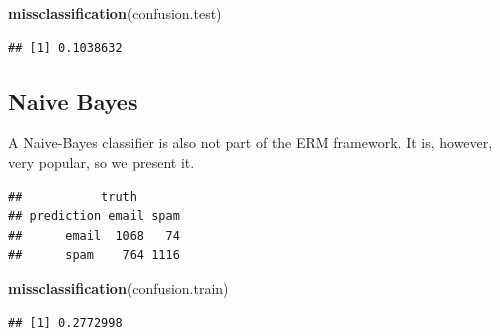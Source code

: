 \documentclass[]{book}
\newenvironment{Shaded}{\begin{snugshade}}{\end{snugshade}}
\newcommand{\KeywordTok}[1]{\textcolor[rgb]{0.13,0.29,0.53}{\textbf{{#1}}}}
\newcommand{\DataTypeTok}[1]{\textcolor[rgb]{0.13,0.29,0.53}{{#1}}}
\newcommand{\FloatTok}[1]{\textcolor[rgb]{0.00,0.00,0.81}{{#1}}}
\newcommand{\StringTok}[1]{\textcolor[rgb]{0.31,0.60,0.02}{{#1}}}
\newcommand{\CommentTok}[1]{\textcolor[rgb]{0.56,0.35,0.01}{\textit{{#1}}}}
\newcommand{\NormalTok}[1]{{#1}}
\theoremstyle{definition}
\theoremstyle{definition}
\theoremstyle{remark}
\begin{document}
\begin{Shaded}
\begin{Highlighting}[]
\KeywordTok{missclassification}\NormalTok{(confusion.test)}
\end{Highlighting}
\end{Shaded}

\begin{verbatim}
## [1] 0.1038632
\end{verbatim}

\subsection{Naive Bayes}\label{naive-bayes}

A Naive-Bayes classifier is also not part of the ERM framework. It is,
however, very popular, so we present it.

\begin{Shaded}
\end{Shaded}

\begin{verbatim}
##           truth
## prediction email spam
##      email  1068   74
##      spam    764 1116
\end{verbatim}

\begin{Shaded}
\begin{Highlighting}[]
\KeywordTok{missclassification}\NormalTok{(confusion.train)}
\end{Highlighting}
\end{Shaded}

\begin{verbatim}
## [1] 0.2772998
\end{verbatim}

\begin{Shaded}
\end{Shaded}
\end{document}
